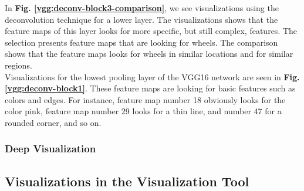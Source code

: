\noindent In \textbf{Fig. \ref{vgg:deconv-block3-comparison}}, we see visualizations using the deconvolution technique for a lower layer. The visualizations shows that the feature maps of this layer looks for more specific, but still complex, features. The selection presents feature maps that are looking for wheels. The comparison shows that the feature maps looks for wheels in similar locations and for similar regions. \\

\noindent Visualizations for the lowest pooling layer of the VGG16 network are seen in \textbf{Fig. \ref{vgg:deconv-block1}}. These feature maps are looking for basic features such as colors and edges. For instance, feature map number 18 obviously looks for the color pink, feature map number 29 looks for a thin line, and number 47 for a rounded corner, and so on.

\begin{comment}
The visualizations show the pattern in the visualization image that was responsible for eliciting activations in the specific feature map. This pattern can reveal what a certain part of the network finds important and what it is looking for in an image. The tools of the figures are linked together similar to the saliency map figures. Additionally, if you click the save tool, all of the deconvolutional visualizations will be downloaded.
\end{comment}

\subsubsection{Deep Visualization}



\begin{comment}
The page presents a grid of figures, with a synthesized image for each network unit chosen for visualization. The synthesized images are optimized to maximally activate their corresponding unit. In other words, they show what the selected units are looking for in an image.
\end{comment}

\subsection{Visualizations in the Visualization Tool}

